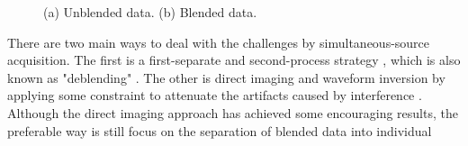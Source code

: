 \begin{figure}[htb!]
  \centering
   \caption{(a) Unblended data. (b) Blended data.} 
   \label{fig:datademo,blenddemo}%
\end{figure}

There are two main ways to deal with the challenges  by simultaneous-source acquisition. The first  is   a first-separate and second-process strategy \cite[]{yangkang20131}, which is also known as "deblending" \cite[]{pana1}. The other is  direct imaging and waveform inversion by applying some constraint to attenuate the artifacts caused by interference \cite[]{verschuur2011,daiwei2012}. Although the direct imaging approach has achieved some encouraging results, the preferable way  is still  focus on the separation of blended data into individual  


